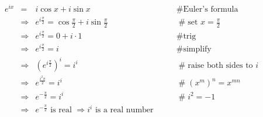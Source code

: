 \documentclass[11pt, oneside]{article}   	%
\begin{document}
    
\begin{equation*}
\begin{array}{lllll}
e^{ix}
&=& i \cos x + i \sin x                                                                                     &\qquad  \mathrel{\#} \text{Euler's formula}           \\ 
&\Rightarrow& e^{i \frac{\pi}{2}}  = \cos \frac{\pi}{2} + i \sin \frac{\pi}{2}        &\qquad  \mathrel{\#} \text{set $x = \frac{\pi}{2}$}  \\
&\Rightarrow& e^{i \frac{\pi}{2}}  = 0 +  i \cdot 1                                           &\qquad  \mathrel{\#} \text{trig}                               \\
&\Rightarrow& e^{i \frac{\pi}{2}}  =  i                                                             &\qquad  \mathrel{\#} \text{simplify}                               \\
&\Rightarrow& (e^{i \frac{\pi}{2}})^i =  i^i                                                       &\qquad  \mathrel{\#} \text{raise both sides to $i$}  \\
&\Rightarrow& e^{\frac{i^2 \pi}{2}} =  i^i                                                        &\qquad  \mathrel{\#}   (x^m)^n = x^{mn}                     \\
&\Rightarrow& e^{- \frac {\pi}{2}} =  i^i                                                          &\qquad  \mathrel{\#} i^2 = -1                                   \\
&\Rightarrow& e^{- \frac {\pi}{2}} \text{ is real $\Rightarrow i^i$ is a real number}
                                                        
                                                        
                                                      
\end{array}
\end{equation*}
\end{document}
